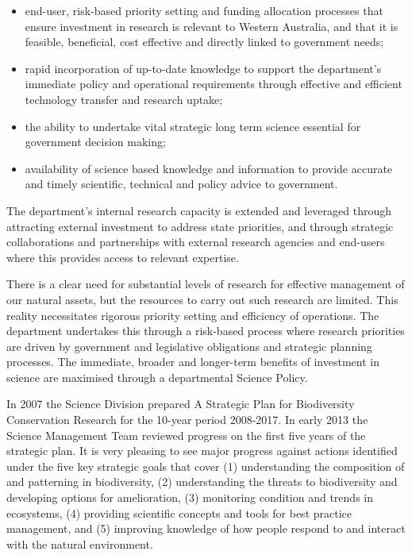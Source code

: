 \documentclass[version=last, paper=a4, DIV=18, usenames, dvipsnames]{scrartcl}
\begin{document}
\begin{itemize}

  \item end-user, risk-based priority setting and funding allocation processes that ensure investment in research is relevant to Western Australia, and that it is feasible, beneficial, cost effective and directly linked to government needs;

  \item rapid incorporation of up-to-date knowledge to support the department's immediate policy and operational requirements through effective and efficient technology transfer and research uptake;

  \item the ability to undertake vital strategic long term science essential for government decision making;

  \item availability of science based knowledge and information to provide accurate and timely scientific, technical and policy advice to government.

\end{itemize}


The department's internal research capacity is extended and leveraged through attracting external investment to address state priorities, and through strategic collaborations and partnerships with external research agencies and end-users where this provides access to relevant expertise.


There is a clear need for substantial levels of research for effective management of our natural assets, but the resources to carry out such research are limited. This reality necessitates rigorous priority setting and efficiency of operations. The department undertakes this through a risk-based process where research priorities are driven by government and legislative obligations and strategic planning processes. The immediate, broader and longer-term benefits of investment in science are maximised through a departmental Science Policy.


In 2007 the Science Division prepared A Strategic Plan for Biodiversity Conservation Research for the 10-year period 2008-2017. In early 2013 the Science Management Team reviewed progress on the first five years of the strategic plan. It is very pleasing to see major progress against actions identified under the five key strategic goals that cover (1) understanding the composition of and patterning in biodiversity, (2) understanding the threats to biodiversity and developing options for amelioration, (3) monitoring condition and trends in ecosystems, (4) providing scientific concepts and tools for best practice management, and (5) improving knowledge of how people respond to and interact with the natural environment.
\end{document}

